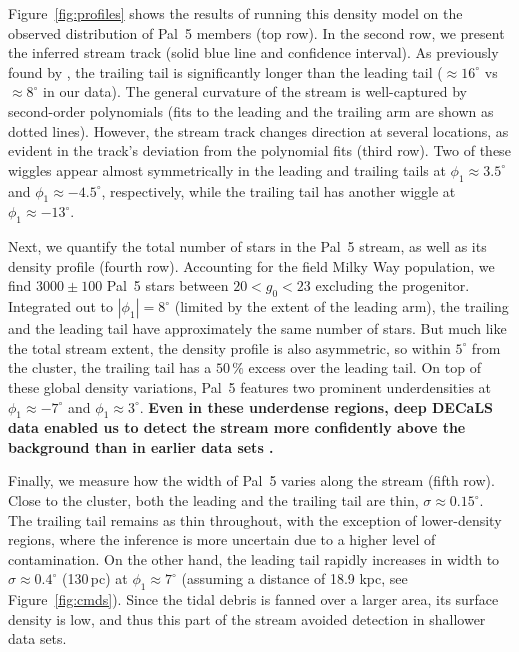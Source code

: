 \documentclass[twocolumn]{aastex62}
\newcommand{\changes}[1]{{\textbf{#1}}}
\begin{document}
Figure~\ref{fig:profiles} shows the results of running this density model on the observed distribution of Pal~5 members (top row).
In the second row, we present the inferred stream track (solid blue line and confidence interval).
As previously found by \citet{Bernard:2016}, the trailing tail is significantly longer than the leading tail ($\approx16^\circ$ vs $\approx8^\circ$ in our data).
The general curvature of the stream is well-captured by second-order polynomials (fits to the leading and the trailing arm are shown as dotted lines).
However, the stream track changes direction at several locations, as evident in the track's deviation from the polynomial fits (third row).
Two of these wiggles appear almost symmetrically in the leading and trailing tails at $\phi_1\approx3.5^\circ$ and $\phi_1\approx-4.5^\circ$, respectively, while the trailing tail has another wiggle at $\phi_1\approx-13^\circ$.

Next, we quantify the total number of stars in the Pal~5 stream, as well as its density profile (fourth row).
Accounting for the field Milky Way population, we find $3000\pm100$ Pal~5 stars between $20<g_0<23$ excluding the progenitor.
Integrated out to $|\phi_1|=8^\circ$ (limited by the extent of the leading arm), the trailing and the leading tail have approximately the same number of stars.
But much like the total stream extent, the density profile is also asymmetric, so within $5^\circ$ from the cluster, the trailing tail has a $50\,\%$ excess over the leading tail.
On top of these global density variations, Pal~5 features two prominent underdensities at $\phi_1\approx-7^\circ$ and $\phi_1\approx3^\circ$.
\changes{Even in these underdense regions, deep DECaLS data enabled us to detect the stream more confidently above the background than in earlier data sets \citep[cf.][]{Bernard:2016, Erkal:2017}.}

Finally, we measure how the width of Pal~5 varies along the stream (fifth row).
Close to the cluster, both the leading and the trailing tail are thin, $\sigma\approx0.15^\circ$.
The trailing tail remains as thin throughout, with the exception of lower-density regions, where the inference is more uncertain due to a higher level of contamination.
On the other hand, the leading tail rapidly increases in width to $\sigma\approx0.4^\circ$ (130\,pc) at $\phi_1\approx7^\circ$ (assuming a distance of 18.9 kpc, see Figure~\ref{fig:cmds}).
Since the tidal debris is fanned over a larger area, its surface density is low, and thus this part of the stream avoided detection in shallower data sets.
\end{document}

